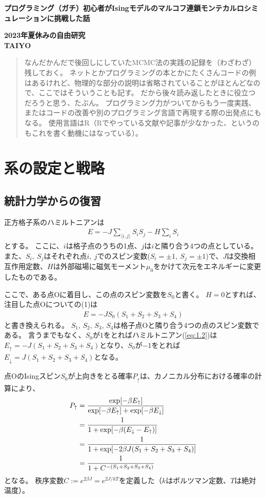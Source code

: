 \documentclass[fontsize = 12pt]{jlreq}
\begin{document}
\noindent
{\Large%
\textbf{%
プログラミング（ガチ）初心者がIsingモデルのマルコフ連鎖モンテカルロシミュレーションに挑戦した話
}}

\noindent
\textbf{%
2023年夏休みの自由研究\\
TAIYO
}

\begin{quotation}
なんだかんだで後回しにしていたMCMC法の実践の記録を（わざわざ）残しておく。
ネットとかプログラミングの本とかにたくさんコードの例はあるけれど、物理的な部分の説明は省略されていることがほとんどなので、ここではそういうことも記す。
だから後々読み返したときに役立つだろうと思う、たぶん。
プログラミング力がついてからもう一度実践、またはコードの改善や別のプログラミング言語で再現する際の出発点にもなる。
使用言語はR（Rでやっている文献や記事が少なかった、というのもこれを書く動機にはなっている）。
\end{quotation}

\section{系の設定と戦略}

\subsection{統計力学からの復習}

正方格子系のハミルトニアンは
\begin{align} \label{eq:1.1}
E = -J \sum_{ \langle i, j \rangle } S_i S_j - H \sum_{i} S_i
\end{align}
とする。
ここに、$i$は格子点のうちの1点、$j$は$i$と隣り合う4つの点としている。
また、$S_i ,~S_j $はそれぞれ点$i,~j$でのスピン変数($S_i = \pm 1,~S_j = \pm 1$)で、$J$は交換相互作用定数、$H$は外部磁場に磁気モーメント$\mu _0$をかけて次元をエネルギーに変更したものである。

ここで、ある点Oに着目し、この点のスピン変数を$S_0 $と書く。
$H = 0$とすれば、注目した点Oについての(1)は
\begin{align} \label{eq:1.2}
E = -J S_0 (S_1 + S_2 + S_3 + S_4 )
\end{align}
と書き換えられる。
$S_1 ,\, S_2 ,\, S_3 ,\, S_4 $は格子点Oと隣り合う4つの点のスピン変数である。
言うまでもなく、$S_0 $が$1$をとればハミルトニアン(\ref{eq:1.2})は$E_\uparrow = -J (S_1 + S_2 + S_3 + S_4 )$となり、$S_0 $が$-1$をとれば$E_\downarrow = J (S_1 + S_2 + S_3 + S_4 )$となる。

点OのIsingスピン$S_0$が上向きをとる確率$P_\uparrow $は、カノニカル分布における確率の計算により、
\begin{align}
P_\uparrow &= \frac{\exp[-\beta E_\uparrow]}{\exp[-\beta E_\uparrow] + \exp[- \beta E_\downarrow] } \notag \\
&= \frac{1}{1 + \exp[-\beta (E_\downarrow - E_\uparrow)]} \notag \\
&= \frac{1}{1 + \exp[-2 \beta J (S_1 + S_2 + S_3 + S_4)]} \notag \\
&= \frac{1}{1 + C^{-(S_1 + S_2 + S_3 + S_4 )}} \label{eq:1.3}
\end{align}
となる。
秩序変数$C := e^{2 \beta J} = e^{2J/{kT}}$を定義した（$k$はボルツマン定数、$T$は絶対温度）。
\end{document}
